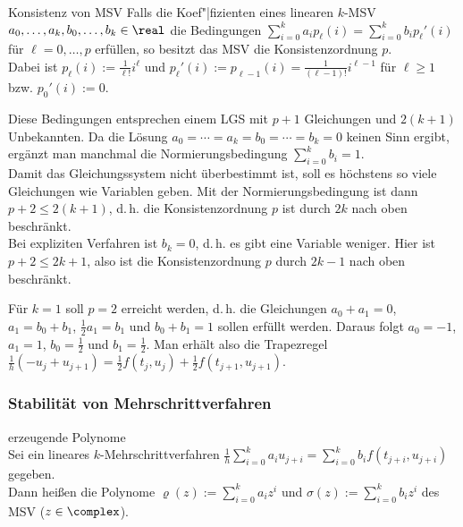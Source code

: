 \begin{Satz}{Konsistenz von MSV}
    Falls die Koef"|fizienten eines linearen $k$-MSV\\
    $a_0, \dotsc, a_k, b_0, \dotsc, b_k \in \real$ die Bedingungen
    $\sum_{i=0}^k a_i p_\ell(i) = \sum_{i=0}^k b_i p_\ell'(i)$ für
    $\ell = 0, \dotsc, p$ erfüllen,
    so besitzt das MSV die Konsistenzordnung $p$.\\
    Dabei ist $p_\ell(i) := \frac{1}{\ell!} i^\ell$ und
    $p_\ell'(i) := p_{\ell-1}(i) = \frac{1}{(\ell - 1)!} i^{\ell - 1}$
    für $\ell \ge 1$ bzw. $p_0'(i) := 0$.
\end{Satz}

\begin{Bem}
    Diese Bedingungen entsprechen einem LGS mit $p + 1$ Gleichungen und
    $2(k + 1)$ Unbekannten.
    Da die Lösung $a_0 = \dotsb = a_k = b_0 = \dotsb = b_k = 0$
    keinen Sinn ergibt,
    ergänzt man manchmal die Normierungsbedingung $\sum_{i=0}^k b_i = 1$.\\
    Damit das Gleichungssystem nicht überbestimmt ist, soll es höchstens so
    viele Gleichungen wie Variablen geben.
    Mit der Normierungsbedingung ist dann $p + 2 \le 2(k + 1)$, d.\,h.
    die Konsistenzordnung $p$ ist durch $2k$ nach oben beschränkt.\\
    Bei expliziten Verfahren ist $b_k = 0$, d.\,h. es gibt eine Variable
    weniger.
    Hier ist $p + 2 \le 2k + 1$, also ist die Konsistenzordnung $p$
    durch $2k - 1$ nach oben beschränkt.
\end{Bem}

\begin{Bsp}
    Für $k = 1$ soll $p = 2$ erreicht werden, d.\,h. die Gleichungen
    $a_0 + a_1 = 0$, $a_1 = b_0 + b_1$, $\frac{1}{2} a_1 = b_1$ und
    $b_0 + b_1 = 1$ sollen erfüllt werden.
    Daraus folgt $a_0 = -1$, $a_1 = 1$, $b_0 = \frac{1}{2}$ und
    $b_1 = \frac{1}{2}$.
    Man erhält also die Trapezregel
    $\frac{1}{h} (-u_j + u_{j+1}) = \frac{1}{2} f(t_j, u_j) +
    \frac{1}{2} f(t_{j+1}, u_{j+1})$.
\end{Bsp}

\pagebreak

\subsubsection{%
    Stabilität von Mehrschrittverfahren%
}

\begin{Def}{erzeugende Polynome}\\
    Sei ein lineares $k$-Mehrschrittverfahren
    $\frac{1}{h} \sum_{i=0}^k a_i u_{j+i} =
    \sum_{i=0}^k b_i f(t_{j+i}, u_{j+i})$
    gegeben.\\
    Dann heißen die Polynome
    $\varrho(z) := \sum_{i=0}^k a_i z^i$ und
    $\sigma(z) := \sum_{i=0}^k b_i z^i$
     des MSV
    ($z \in \complex$).
\end{Def}

